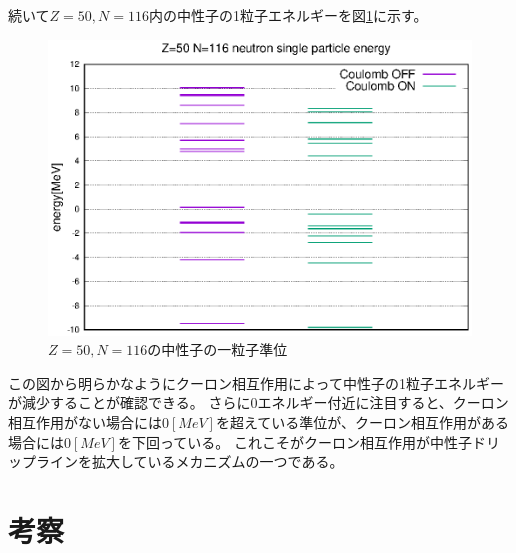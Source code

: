 \documentclass[12pt]{jarticle}
\begin{document}
続いて$Z=50,N=116$内の中性子の1粒子エネルギーを図\ref{fig:SLY4_ON_Z=50_N=116_spe}に示す。
\begin{figure}[H]
    \centering
    \includegraphics{../SLY4_Z=50_N=116_speN.eps}
    \caption{$Z=50,N=116$の中性子の一粒子準位}\label{fig:SLY4_ON_Z=50_N=116_spe}
\end{figure}
この図から明らかなようにクーロン相互作用によって中性子の1粒子エネルギーが減少することが確認できる。
さらに0エネルギー付近に注目すると、クーロン相互作用がない場合には$0[MeV]$を超えている準位が、クーロン相互作用がある場合には$0[MeV]$を下回っている。
これこそがクーロン相互作用が中性子ドリップラインを拡大しているメカニズムの一つである。


\section{考察}
\end{document}

